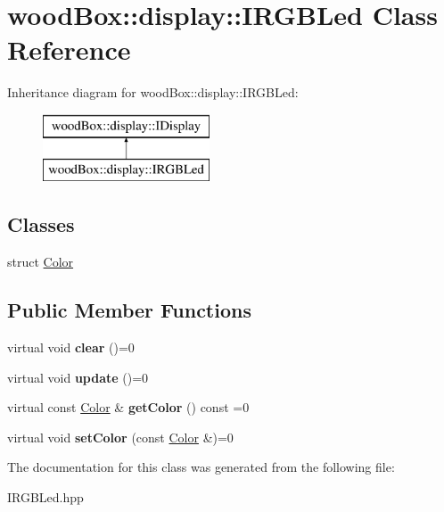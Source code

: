 \hypertarget{classwood_box_1_1display_1_1_i_r_g_b_led}{}\section{wood\+Box\+:\+:display\+:\+:I\+R\+G\+B\+Led Class Reference}
\label{classwood_box_1_1display_1_1_i_r_g_b_led}
Inheritance diagram for wood\+Box\+:\+:display\+:\+:I\+R\+G\+B\+Led\+:\begin{figure}[H]
\begin{center}
\leavevmode
\includegraphics[height=2.000000cm]{classwood_box_1_1display_1_1_i_r_g_b_led}
\end{center}
\end{figure}
\subsection*{Classes}
\begin{DoxyCompactItemize}
\item 
struct \mbox{\hyperlink{structwood_box_1_1display_1_1_i_r_g_b_led_1_1_color}{Color}}
\end{DoxyCompactItemize}
\subsection*{Public Member Functions}
\begin{DoxyCompactItemize}
\item 
\mbox{\label{classwood_box_1_1display_1_1_i_r_g_b_led_a023df51cd4d84ac74f3c489428b5bc3c}} 
virtual void {\bfseries clear} ()=0
\item 
\mbox{\label{classwood_box_1_1display_1_1_i_r_g_b_led_a41a5a8a358a7e7ae337741f1f3ca7186}} 
virtual void {\bfseries update} ()=0
\item 
\mbox{\label{classwood_box_1_1display_1_1_i_r_g_b_led_a770327a3dd8526bef31fe763cfb76462}} 
virtual const \mbox{\hyperlink{structwood_box_1_1display_1_1_i_r_g_b_led_1_1_color}{Color}} \& {\bfseries get\+Color} () const =0
\item 
\mbox{\label{classwood_box_1_1display_1_1_i_r_g_b_led_a3465053e8bf6ed7cfd1990f15d856ed7}} 
virtual void {\bfseries set\+Color} (const \mbox{\hyperlink{structwood_box_1_1display_1_1_i_r_g_b_led_1_1_color}{Color}} \&)=0
\end{DoxyCompactItemize}


The documentation for this class was generated from the following file\+:\begin{DoxyCompactItemize}
\item 
I\+R\+G\+B\+Led.\+hpp\end{DoxyCompactItemize}
